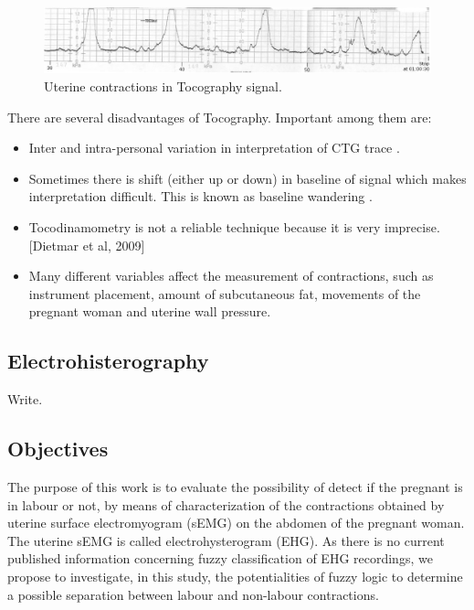 \documentclass[bioengineering,article,submit,moreauthors,pdftex,10pt,a4paper]{mdpi}
\begin{document}
\begin{figure}[H]
	\caption{\label{toco} Uterine contractions in Tocography signal.}
	\begin{center}
		\includegraphics[scale=0.45]{imagens/toco.jpg} 		
	\end{center}
\end{figure}

There are several disadvantages of Tocography. Important
among them are:

\begin{itemize}[leftmargin=*,labelsep=5.8mm]
	\item	Inter and intra-personal variation in interpretation of CTG trace \cite{ref-bernardes}.
	
	\item	Sometimes there is shift (either up or down) in baseline of signal which makes interpretation difficult. This is known as baseline wandering \cite{ref-marques}. 	
	
	\item Tocodinamometry is not a reliable technique because it is very imprecise. [Dietmar et al, 2009]
	
	\item Many different variables affect the measurement of contractions, such as instrument placement, amount of subcutaneous fat, movements of the pregnant woman and uterine wall pressure.
\end{itemize}


\subsection{Electrohisterography}

Write.



\subsection{Objectives}
The purpose of this work is to evaluate the possibility of detect if the pregnant is in labour or not, by means of characterization of the contractions obtained by uterine surface electromyogram (sEMG) on the abdomen of the pregnant woman. The uterine sEMG is called electrohysterogram (EHG).  As there is no current published information concerning fuzzy classification of EHG recordings, we propose to investigate, in this study, the potentialities of fuzzy logic to determine a possible separation between labour and non-labour contractions.
\end{document}
